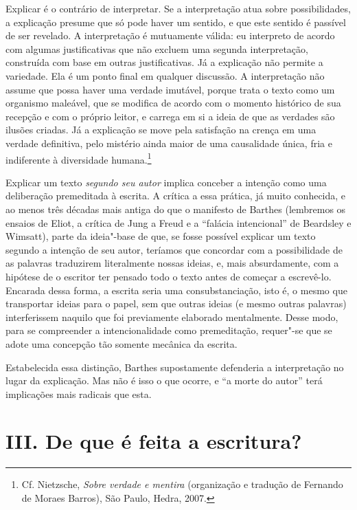 Explicar é o contrário de interpretar. Se a interpretação atua sobre
possibilidades, a explicação presume que só pode haver um sentido, e que
este sentido é passível de ser revelado. A interpretação é mutuamente
válida: eu interpreto de acordo com algumas justificativas que não
excluem uma segunda interpretação, construída com base em outras
justificativas. Já a explicação não permite a variedade. Ela é um ponto
final em qualquer discussão. A interpretação não assume que possa haver
uma verdade imutável, porque trata o texto como um organismo maleável,
que se modifica de acordo com o momento histórico de sua recepção e com
o próprio leitor, e carrega em si a ideia de que as verdades são ilusões
criadas. Já a explicação se move pela satisfação na crença em uma
verdade definitiva, pelo mistério ainda maior de uma causalidade única,
fria e indiferente à diversidade humana.\footnote{Cf. Nietzsche,
  \emph{Sobre verdade e mentira} (organização e tradução de Fernando de
  Moraes Barros), São Paulo, Hedra, 2007.}

Explicar um texto \emph{segundo seu autor} implica conceber a intenção como uma
deliberação premeditada à escrita. A crítica a essa prática, já muito
conhecida, e ao menos três décadas mais antiga do que o manifesto de
Barthes (lembremos os ensaios de Eliot, a crítica de Jung a Freud e a ``falácia intencional'' de Beardsley e Wimsatt), parte da ideia"-base de
que, se fosse possível explicar um texto segundo a intenção de seu
autor, teríamos que concordar com a possibilidade de as palavras
traduzirem literalmente nossas ideias, e, mais absurdamente, com a
hipótese de o escritor ter pensado todo o texto antes de começar a
escrevê-lo. Encarada dessa forma, a escrita seria uma consubstanciação,
isto é, o mesmo que transportar ideias para o papel, sem que outras
ideias (e mesmo outras palavras) interferissem naquilo que foi
previamente elaborado mentalmente. Desse modo, para se compreender a
intencionalidade como premeditação, requer"-se que se adote uma concepção
tão somente mecânica da escrita.

Estabelecida essa distinção, Barthes supostamente defenderia a
interpretação no lugar da explicação. Mas não é isso o que ocorre, e ``a
morte do autor'' terá implicações mais radicais que esta.

\section*{III. De que é feita a escritura?}

